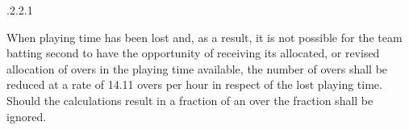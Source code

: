 \documentclass[12pt]{article}
\begin{document}
\vspace{\baselineskip}

\vspace{\baselineskip}

\vspace{\baselineskip}

\vspace{\baselineskip}

\vspace{\baselineskip}

\vspace{\baselineskip}

\vspace{\baselineskip}

\vspace{\baselineskip}

\vspace{\baselineskip}

\vspace{\baselineskip}

\vspace{\baselineskip}

\vspace{\baselineskip}

\vspace{\baselineskip}

\vspace{\baselineskip}

\vspace{\baselineskip}

\vspace{\baselineskip}

\vspace{\baselineskip}

\vspace{\baselineskip}

\vspace{\baselineskip}

\vspace{\baselineskip}
\begin{Center}
{\fontsize{8pt}{9.6pt}\par}
\end{Center}\par


\vspace{\baselineskip}

\vspace{\baselineskip}
\begin{adjustwidth}{1.97in}{0.03in}
{\fontsize{9pt}{10.8pt}.2.2.1 \tabto{1.96in} {\fontsize{8pt}{9.6pt}\selectfont When playing time has been lost and, as a result, it is not possible for the team batting second to have the opportunity of receiving its allocated, or revised allocation of overs in the playing time available, the number of overs shall be reduced at a rate of 14.11 overs per hour in respect of the lost playing time. Should the calculations result in a fraction of an over the fraction shall be ignored.\par}\par}\par

\end{adjustwidth}
\end{document}
